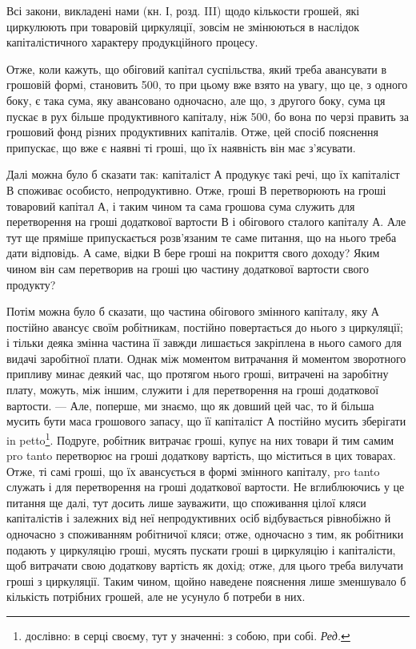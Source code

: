 Всі закони, викладені нами (кн. І, розд. III) щодо кількости грошей,
які циркулюють при товаровій циркуляції, зовсім не змінюються в наслідок
капіталістичного характеру продукційного процесу.

Отже, коли кажуть, що обіговий капітал суспільства, який треба
авансувати в грошовій формі, становить 500, то при цьому вже
взято на увагу, що це, з одного боку, є така сума, яку авансовано одночасно,
але що, з другого боку, сума ця пускає в рух більше продуктивного
капіталу, ніж 500, бо вона по черзі править за грошовий
фонд різних продуктивних капіталів. Отже, цей спосіб пояснення
припускає, що вже є наявні ті гроші, що їх наявність він має з’ясувати.

Далі можна було б сказати так: капіталіст $А$ продукує такі речі, що
їх капіталіст $В$ споживає особисто, непродуктивно. Отже, гроші $В$ перетворюють
на гроші товаровий капітал $А$, і таким чином та сама грошова
сума служить для перетворення на гроші додаткової вартости $В$ і
обігового сталого капіталу $А$. Але тут ще пряміше припускається розв’язаним
те саме питання, що на нього треба дати відповідь. А саме, відки
$В$ бере гроші на покриття свого доходу? Яким чином він сам перетворив
на гроші цю частину додаткової вартости свого продукту?

Потім можна було б сказати, що частина обігового змінного капіталу,
яку $А$ постійно авансує своїм робітникам, постійно повертається до нього
з циркуляції; і тільки деяка змінна частина її завжди лишається закріплена
в нього самого для видачі заробітної плати. Однак між моментом
витрачання й моментом зворотного припливу минає деякий час, що
протягом нього гроші, витрачені на заробітну плату, можуть, між іншим,
служити і для перетворення на гроші додаткової вартости. — Але, поперше,
ми знаємо, що як довший цей час, то й більша мусить бути маса грошового
запасу, що її капіталіст $А$ постійно мусить зберігати in petto\footnote*{
дослівно: в серці своєму, тут у значенні: з собою, при собі. \emph{Ред.}
}.
Подруге, робітник витрачає гроші, купує на них товари й тим самим
pro tanto перетворює на гроші додаткову вартість, що міститься в цих
товарах. Отже, ті самі гроші, що їх авансується в формі змінного капіталу,
pro tanto служать і для перетворення на гроші додаткової вартости.
Не вглиблюючись у це питання ще далі, тут досить лише зауважити, що
споживання цілої кляси капіталістів і залежних від неї непродуктивних
осіб відбувається рівнобіжно й одночасно з споживанням робітничої кляси;
отже, одночасно з тим, як робітники подають у циркуляцію гроші,
мусять пускати гроші в циркуляцію і капіталісти, щоб витрачати свою
додаткову вартість як дохід; отже, для цього треба вилучати гроші з
циркуляції. Таким чином, щойно наведене пояснення лише зменшувало б
кількість потрібних грошей, але не усунуло б потреби в них.

